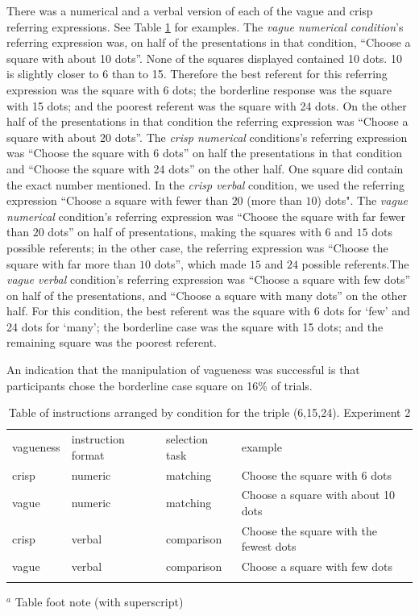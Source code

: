 \documentclass[graybox,envcountchap,sectrefs%
,footinfo
]{svmono}
\begin{document}
There was a numerical and a verbal version of each of the vague and crisp referring expressions. See Table \ref{instructionse2} for examples.
The {\em vague numerical condition}'s referring expression was, on half of the presentations in that condition, ``Choose a square with about 10 dots''. None of the squares displayed contained 10 dots. 10 is slightly closer to 6 than to 15. Therefore the best referent for this referring expression was the square with 6 dots;  the borderline response was the square with 15 dots; and the poorest referent was the square with 24 dots. On the other half of the presentations in that condition the referring expression was ``Choose a square with about 20 dots''. The {\em crisp numerical} conditions's referring expression was ``Choose the square with 6 dots'' on half the presentations in that condition and ``Choose the square with 24 dots'' on the other half. One square did contain the exact number mentioned.  In the {\em crisp verbal} condition, we used the referring expression ``Choose a square with fewer than $20$ (more than $10$) dots".  The {\em vague numerical} condition's referring expression was ``Choose the square with far fewer than $20$ dots'' on half of presentations, making the squares with 6 and $15$ dots possible referents; in the other case, the referring expression was ``Choose the square with far more than $10$ dots'', which made $15$ and $24$ possible referents.The {\em vague verbal} condition's referring expression was ``Choose a square with few dots'' on half of the presentations, and ``Choose a square with many dots'' on the other half. For this condition, the best referent was the square with 6 dots for `few' and 24 dots for `many'; the borderline case was the square with 15 dots; and the remaining square was the poorest referent. 

An indication that the manipulation of vagueness was successful is that participants chose the borderline case square on 16\% of trials.

\begin{table}
\caption{Table of instructions arranged by condition for the triple (6,15,24). Experiment 2}
\label{instructionse2} 
\begin{tabular}{llll}
\hline\noalign{\smallskip}
vagueness&instruction format&selection task&example\\
\noalign{\smallskip}\svhline\noalign{\smallskip}
crisp 	& 	numeric	& matching	&	Choose the square with 6 dots \\
vague	&	numeric 	& matching	&	Choose a square with about 10 dots\\
crisp		&	verbal	& comparison	&	Choose the square with the fewest dots\\
vague	&	verbal	& comparison	&	Choose a square with few dots\\
\noalign{\smallskip}\hline\noalign{\smallskip}
\end{tabular}
$^a$ Table foot note (with superscript)\\
\end{table}
\end{document}
